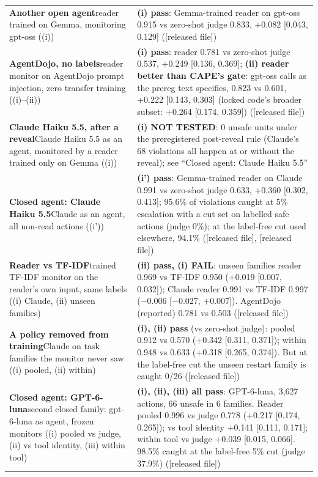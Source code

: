 {\begin{longtable}{p{}p{}}
\textbf{Another open agent}\newline reader trained on Gemma, monitoring gpt-oss ((i)) & \textbf{(i) pass}: Gemma-trained reader on gpt-oss 0.915 vs zero-shot judge 0.833, +0.082 [0.043, 0.129] ([released file])\\[2pt]
\textbf{AgentDojo, no labels}\newline reader monitor on AgentDojo prompt injection, zero transfer training ((i)--(ii)) & \textbf{(i) pass}: reader 0.781 vs zero-shot judge 0.537, +0.249 [0.136, 0.369]; \textbf{(ii) reader better than CAPE's gate}: gpt-oss calls as the prereg text specifies, 0.823 vs 0.601, +0.222 [0.143, 0.303] (locked code's broader subset: +0.264 [0.174, 0.359]) ([released file])\\[2pt]
\textbf{Claude Haiku 5.5, after a reveal}\newline Claude Haiku 5.5 as an agent, monitored by a reader trained only on Gemma ((i)) & \textbf{(i) NOT TESTED}: 0 unsafe units under the preregistered post-reveal rule (Claude's 68 violations all happen at or without the reveal); see ``Closed agent: Claude Haiku 5.5''\\[2pt]
\textbf{Closed agent: Claude Haiku 5.5}\newline Claude as an agent, all non-read actions ((i')) & \textbf{(i') pass}: Gemma-trained reader on Claude 0.991 vs zero-shot judge 0.633, +0.360 [0.302, 0.413]; 95.6\% of violations caught at 5\% escalation with a cut set on labelled safe actions (judge 0\%); at the label-free cut used elsewhere, 94.1\% ([released file], [released file])\\[2pt]
\textbf{Reader vs TF-IDF}\newline trained TF-IDF monitor on the reader's own input, same labels ((i) Claude, (ii) unseen families) & \textbf{(ii) pass, (i) FAIL}: unseen families reader 0.969 vs TF-IDF 0.950 (+0.019 [0.007, 0.032]); Claude reader 0.991 vs TF-IDF 0.997 ($-$0.006 [$-$0.027, +0.007]). AgentDojo (reported) 0.781 vs 0.503 ([released file])\\[2pt]
\textbf{A policy removed from training}\newline Claude on task families the monitor never saw ((i) pooled, (ii) within) & \textbf{(i), (ii) pass} (vs zero-shot judge): pooled 0.912 vs 0.570 (+0.342 [0.311, 0.371]); within 0.948 vs 0.633 (+0.318 [0.265, 0.374]). But at the label-free cut the unseen restart family is caught 0/26 ([released file])\\[2pt]
\textbf{Closed agent: GPT-6-luna}\newline second closed family: gpt-6-luna as agent, frozen monitors ((i) pooled vs judge, (ii) vs tool identity, (iii) within tool) & \textbf{(i), (ii), (iii) all pass}: GPT-6-luna, 3,627 actions, 66 unsafe in 6 families. Reader pooled 0.996 vs judge 0.778 (+0.217 [0.174, 0.265]); vs tool identity +0.141 [0.111, 0.171]; within tool vs judge +0.039 [0.015, 0.066]. 98.5\% caught at the label-free 5\% cut (judge 37.9\%) ([released file])\\[2pt]

\end{longtable}}
